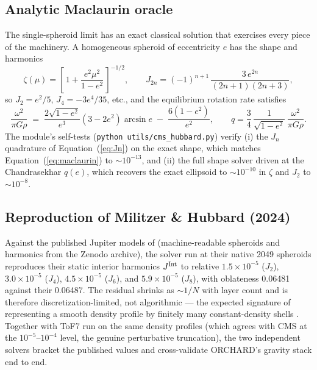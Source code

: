 \documentclass{aastex631}
\begin{document}
\subsection{Analytic Maclaurin oracle}

The single-spheroid limit has an exact classical solution
\citep{Chandrasekhar1969} that exercises every piece of the machinery.
A homogeneous spheroid of eccentricity $e$ has the shape and harmonics
\begin{equation}
\zeta(\mu) = \left[\,1 + \frac{e^2 \mu^2}{1 - e^2}\,\right]^{-1/2},
\qquad
J_{2n} = (-1)^{n+1}\, \frac{3\, e^{2n}}{(2n+1)(2n+3)} ,
\label{eq:maclaurin}
\end{equation}
so $J_2 = e^2/5$, $J_4 = -3e^4/35$, etc., and the equilibrium rotation
rate satisfies
\begin{equation}
\frac{\omega^2}{\pi G \rho} \;=\;
\frac{2\sqrt{1-e^2}}{e^3}\left(3 - 2e^2\right)\arcsin e
\;-\; \frac{6\left(1-e^2\right)}{e^2},
\qquad
q = \frac{3}{4}\,\frac{1}{\sqrt{1-e^2}}\,\frac{\omega^2}{\pi G \rho}.
\label{eq:chandra}
\end{equation}
The module's self-tests (\texttt{python utils/cms\_hubbard.py}) verify
(i) the $J_n$ quadrature of Equation~(\ref{eq:Jn}) on the exact shape,
which matches Equation~(\ref{eq:maclaurin}) to $\sim\!10^{-13}$, and
(ii) the full shape solver driven at the Chandrasekhar $q(e)$, which
recovers the exact ellipsoid to $\sim\!10^{-10}$ in $\zeta$ and $J_2$ to
$\sim\!10^{-8}$.

\subsection{Reproduction of Militzer \& Hubbard (2024)}

Against the published Jupiter models of \citet{MilitzerHubbard2024}
(machine-readable spheroids and harmonics from the Zenodo archive), the
solver run at their native 2049 spheroids reproduces their static
interior harmonics $J^{\rm Int}$ to relative $1.5\times10^{-5}$ ($J_2$),
$3.0\times10^{-5}$ ($J_4$), $4.5\times10^{-5}$ ($J_6$), and
$5.9\times10^{-5}$ ($J_8$), with oblateness 0.06481 against their
0.06487.  The residual shrinks as $\sim\!1/N$ with layer count and is
therefore discretization-limited, not algorithmic --- the expected
signature of representing a smooth density profile by finitely many
constant-density shells \citep[cf.\ the precision study of]
[]{DebrasChabrier2018}.  Together with ToF7 run on the same density
profiles (which agrees with CMS at the $10^{-5}$--$10^{-4}$ level,
the genuine perturbative truncation), the two independent solvers
bracket the published values and cross-validate ORCHARD's gravity
stack end to end.
\end{document}
